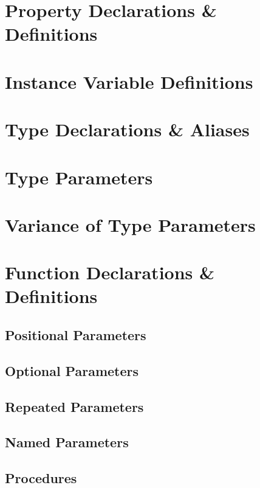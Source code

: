 \section{Property Declarations \& Definitions}

\section{Instance Variable Definitions}

\section{Type Declarations \& Aliases}

\section{Type Parameters}

\section{Variance of Type Parameters}

\section{Function Declarations \& Definitions}

\subsection{Positional Parameters}

\subsection{Optional Parameters}

\subsection{Repeated Parameters}

\subsection{Named Parameters}

\subsection{Procedures}

